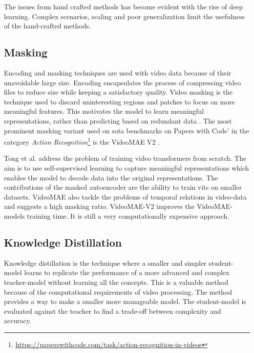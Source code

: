 The issues from hand crafted methods has become evident with the rise of deep learning. Complex scenarios, scaling and poor generalization limit the usefulness of the hand-crafted methods. 

\subsection{Masking}

Encoding and masking techniques are used with video data because of their unavoidable large size. Encoding encapsulates the process of compressing video files to reduce size while keeping a satisfactory quality. Video masking is the technique used to discard uninteresting regions and patches to focus on more meaningful features. This motivates the model to learn meaningful representations, rather than predicting based on redundant data \cite{tong_videomae_2022}. The most prominent masking variant used on \acrshort{sota} benchmarks on Papers with Code' in the category \textit{Action Recognition}\footnote{\url{https://paperswithcode.com/task/action-recognition-in-videos}} is the VideoMAE V2 \cite{wang_videomae_2023}. 

Tong et al. \cite{tong_videomae_2022} address the problem of training video transformers from scratch. The aim is to use self-supervised learning to capture meaningful representations which enables the model to decode data into the original representations. The contributions of the masked autoencoder \cite{tong_videomae_2022} are the ability to train \acrshort{vit}s on smaller datasets. VideoMAE \cite{tong_videomae_2022} also tackle the problems of temporal relations in video-data and suggests a high masking ratio. VideoMAE-V2 \cite{wang_videomae_2023} improves the VideoMAE-models training time. It is still a very computationally expensive approach. 


\subsection{Knowledge Distillation}

Knowledge distillation \cite{denize_comedian_2024} \cite{li_videomamba_2024} \cite{bose_soccerkdnet_2023} is the technique where a smaller and simpler student-model learns to replicate the performance of a more advanced and complex teacher-model without learning all the concepts. This is a valuable method because of the computational requirements of video processing. The method provides a way to make a smaller more manageable model. The student-model is evaluated against the teacher to find a trade-off between complexity and accuracy. 

